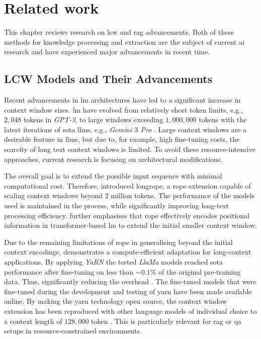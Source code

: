 \chapter{Related work}\label{ch:relatedWork}
This chapter reviews research on \ac{lcw} and \ac{rag} advancements.
Both of these methods for knowledge processing and extraction are the subject of current \ac{ai} research and have experienced major advancements in recent time.
%
\section{LCW Models and Their Advancements}\label{sec:large_context}

Recent advancements in \ac{lm} architectures have led to a significant increase in context window sizes.
\ac{lm} have evolved from relatively short token limits, e.g., $2,048$ tokens in \textit{GPT-3}, to large windows exceeding $1{,}000{,}000$ tokens with the latest iterations of \ac{sota} \acp{llm}, e.g., \textit{Gemini $3$ Pro} \citet{Google2026Models}.
%
Large context windows are a desirable feature in \acp{llm}, but due to, for example, high fine-tuning costs, the scarcity of long text context windows is limited\citep{ding2024longrope}.
To avoid these resource-intensive approaches, current research is focusing on architectural modifications.

The overall goal is to extend the possible input sequence with minimal computational cost. 
Therefore, \citet{ding2024longrope} introduced \ac{longrope}, a \ac{rope} extension capable of scaling context windows beyond $2$ million tokens.
The performance of the models used is maintained in the process, while significantly improving long-text processing efficiency\citep{ding2024longrope}.
\citet{peng2024yarn} further emphasises that \ac{rope} effectively encodes positional information in transformer-based \ac{lm} to extend the initial smaller context window. 

Due to the remaining limitations of \ac{rope} in generalising beyond the initial context encodings, \citet{peng2024yarn} demonstrates a compute-efficient adaptation for long-context applications.
By applying \textit{YaRN} the tested \textit{LlaMa} models reached \ac{sota} performance after fine-tuning on less than $\sim0.1\%$ of the original pre-training data.
Thus, significantly reducing the overhead \citep{peng2024yarn}.
The fine-tuned models that were fine-tuned during the development and testing of \ac{yarn} have been made available online.
By making the \ac{yarn} technology open source, the context window extension has been reproduced with other language models of individual choice to a context length of $128,000$ token \citep{peng2024yarn}.
This is particularly relevant for \ac{rag} or \ac{qa} setups in resource-constrained environments.
%

